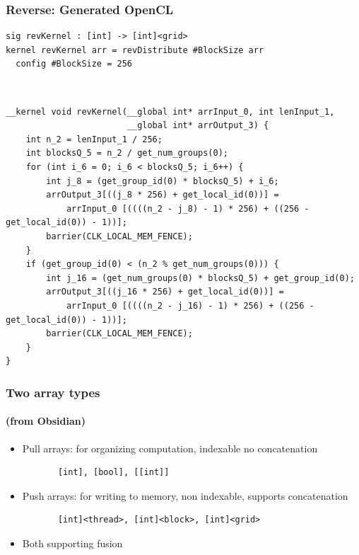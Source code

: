 \documentclass{beamer}
\begin{document}
\begin{frame}[fragile]
\end{frame}

\begin{frame}[fragile]
  \frametitle{Reverse: Generated OpenCL}
\begin{verbatim}
sig revKernel : [int] -> [int]<grid>
kernel revKernel arr = revDistribute #BlockSize arr
  config #BlockSize = 256
\end{verbatim}

~

{\tiny
  \begin{verbatim}
__kernel void revKernel(__global int* arrInput_0, int lenInput_1,
                        __global int* arrOutput_3) {
    int n_2 = lenInput_1 / 256;
    int blocksQ_5 = n_2 / get_num_groups(0);
    for (int i_6 = 0; i_6 < blocksQ_5; i_6++) {
        int j_8 = (get_group_id(0) * blocksQ_5) + i_6;
        arrOutput_3[((j_8 * 256) + get_local_id(0))] = 
            arrInput_0 [((((n_2 - j_8) - 1) * 256) + ((256 - get_local_id(0)) - 1))];
        barrier(CLK_LOCAL_MEM_FENCE);
    }
    if (get_group_id(0) < (n_2 % get_num_groups(0))) {
        int j_16 = (get_num_groups(0) * blocksQ_5) + get_group_id(0);
        arrOutput_3[((j_16 * 256) + get_local_id(0))] = 
            arrInput_0 [((((n_2 - j_16) - 1) * 256) + ((256 - get_local_id(0)) - 1))];
        barrier(CLK_LOCAL_MEM_FENCE);
    }
}
\end{verbatim}
}
\end{frame}

\begin{frame}
  \frametitle{Two array types}
  \framesubtitle{(from Obsidian)}

  \begin{itemize}
  \item Pull arrays: for organizing computation, indexable no concatenation
    \begin{verbatim}
       [int], [bool], [[int]]\end{verbatim}
  \item Push arrays: for writing to memory, non indexable, supports concatenation
    \begin{verbatim}
       [int]<thread>, [int]<block>, [int]<grid>\end{verbatim}
   \item Both supporting fusion
  \end{itemize}  
\end{frame}
\end{document}
